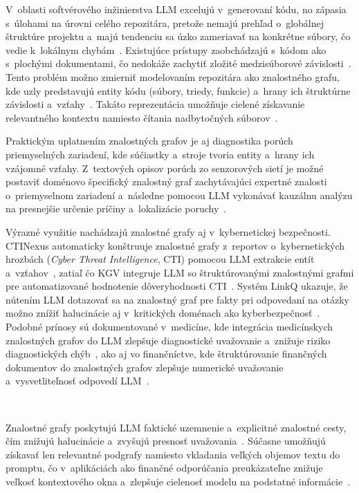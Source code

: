 V~oblasti softvérového inžinierstva LLM excelujú v~generovaní kódu, no zápasia s~úlohami na úrovni celého repozitára, pretože nemajú prehľad o~globálnej štruktúre projektu a~majú tendenciu sa úzko zameriavať na konkrétne súbory, čo vedie k~lokálnym chybám~\cite{ouyang2024repograph}. Existujúce prístupy zaobchádzajú s~kódom ako s~plochými dokumentami, čo nedokáže zachytiť zložité medzisúborové závislosti~\cite{ouyang2024repograph}. Tento problém možno zmierniť modelovaním repozitára ako znalostného grafu, kde uzly predstavujú entity kódu (súbory, triedy, funkcie) a~hrany ich štruktúrne závislosti a~vzťahy~\cite{shrivastava2025kgcode,yang2025kgcompass}. Takáto reprezentácia umožňuje cielené získavanie relevantného kontextu namiesto čítania nadbytočných súborov~\cite{ouyang2024repograph,yang2025kgcompass}.
 
Praktickým uplatnením znalostných grafov je aj diagnostika porúch priemyselných zariadení, kde súčiastky a~stroje tvoria entity a~hrany ich vzájomné vzťahy. Z~textových opisov porúch zo senzorových sietí je možné postaviť doménovo špecifický znalostný graf zachytávajúci expertné znalosti o~priemyselnom zariadení a~následne pomocou LLM vykonávať kauzálnu analýzu na presnejšie určenie príčiny a~lokalizácie poruchy~\cite{liu2024kgicl}.
 
Výrazné využitie nachádzajú znalostné grafy aj v~kybernetickej bezpečnosti. CTINexus automaticky konštruuje znalostné grafy z~reportov o~kybernetických hrozbách (\emph{Cyber Threat Intelligence}, CTI) pomocou LLM extrakcie entít a~vzťahov~\cite{cheng2024ctinexus}, zatiaľ čo KGV integruje LLM so štruktúrovanými znalostnými grafmi pre automatizované hodnotenie dôveryhodnosti CTI~\cite{wu2024kgv}. Systém LinkQ ukazuje, že nútením LLM dotazovať sa na znalostný graf pre fakty pri odpovedaní na otázky možno znížiť halucinácie aj v~kritických doménach ako kyberbezpečnosť~\cite{li2025linkq}. Podobné prínosy sú dokumentované v~medicíne, kde integrácia medicínskych znalostných grafov do LLM zlepšuje diagnostické uvažovanie a~znižuje riziko diagnostických chýb~\cite{gao2023drknows,duan2024medikal}, ako aj vo finančníctve, kde štruktúrovanie finančných dokumentov do znalostných grafov zlepšuje numerické uvažovanie a~vysvetliteľnosť odpovedí LLM~\cite{srivastava2026structurefirst,lee2025kgstock}.

\
 
Znalostné grafy poskytujú LLM faktické uzemnenie a~explicitné znalostné cesty, čím znižujú halucinácie a~zvyšujú presnosť uvažovania~\cite{agrawal2023kgsurvey,sousa2024kgnlp}. Súčasne umožňujú získavať len relevantné podgrafy namiesto vkladania veľkých objemov textu do promptu, čo v~aplikáciách ako finančné odporúčania preukázateľne znižuje veľkosť kontextového okna a~zlepšuje cielenosť modelu na podstatné informácie~\cite{spadea2025ragflarko}.




